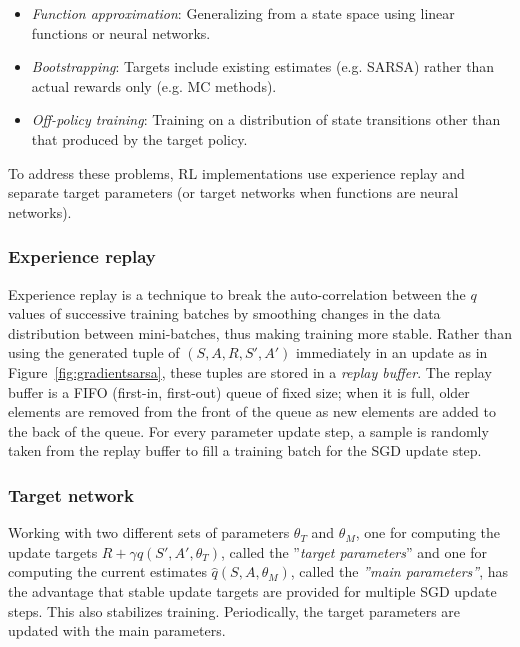 \begin{itemize}
\item \emph{Function approximation}: Generalizing from a state space using linear functions or neural networks.
\item \emph{Bootstrapping}: Targets include existing estimates (e.g. SARSA) rather than actual rewards only (e.g. MC methods).
\item \emph{Off-policy training}: Training on a distribution of state transitions other than that produced by the target policy.
\end{itemize}

To address these problems, RL implementations use experience replay and separate target parameters (or target networks when functions are neural networks). 

\subsubsection*{Experience replay} 

Experience replay is a technique to break the auto-correlation between the $q$ values of successive training batches by smoothing changes in the data distribution between mini-batches, thus making training more stable. Rather than using the generated tuple of $(S, A, R, S', A')$ immediately in an update as in Figure~\ref{fig:gradientsarsa}, these tuples are stored in a \emph{replay buffer}. The replay buffer is a FIFO (first-in, first-out) queue of fixed size; when it is full, older elements are removed from the front of the queue as new elements are added to the back of the queue. For every parameter update step, a sample is randomly taken from the replay buffer to fill a training batch for the SGD update step. 

\subsubsection*{Target network}

Working with two different sets of parameters $\theta_T$ and $\theta_M$, one for computing the update targets $R + \gamma \hat{q}(S', A', \theta_T)$, called the ''\emph{target parameters}'' and one for computing the current estimates $\hat{q}(S, A, \theta_M)$, called the \emph{''main parameters''}, has the advantage that stable update targets are provided for multiple SGD update steps. This also stabilizes training. Periodically, the target parameters are updated with the main parameters.

